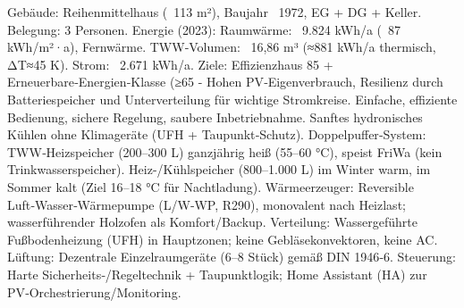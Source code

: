 \markdownRendererDocumentBegin
\markdownRendererSectionBegin
{}\markdownRendererInterblockSeparator
{}\markdownRendererUlBeginTight
\markdownRendererUlItem Gebäude: Reihenmittelhaus (~113 m²), Baujahr ~1972, EG + DG + Keller.\markdownRendererUlItemEnd 
\markdownRendererUlItem Belegung: 3 Personen.\markdownRendererUlItemEnd 
\markdownRendererUlItem Energie (2023):\markdownRendererUlItemEnd 
\markdownRendererUlItem Raumwärme: ~9.824 kWh/a (~87 kWh/m²·a), Fernwärme.\markdownRendererUlItemEnd 
\markdownRendererUlItem TWW‑Volumen: ~16,86 m³ (≈881 kWh/a thermisch, ΔT≈45 K).\markdownRendererUlItemEnd 
\markdownRendererUlItem Strom: ~2.671 kWh/a.\markdownRendererUlItemEnd 
\markdownRendererUlItem Ziele:\markdownRendererUlItemEnd 
\markdownRendererUlItem Effizienzhaus 85 + Erneuerbare‑Energien‑Klasse (≥65 - Hohen PV‑Eigenverbrauch, Resilienz durch Batteriespeicher und Unterverteilung für wichtige Stromkreise.\markdownRendererUlItemEnd 
\markdownRendererUlItem Einfache, effiziente Bedienung, sichere Regelung, saubere Inbetriebnahme.\markdownRendererUlItemEnd 
\markdownRendererUlItem Sanftes hydronisches Kühlen ohne Klimageräte (UFH + Taupunkt‑Schutz).\markdownRendererUlItemEnd 
\markdownRendererUlEndTight \markdownRendererInterblockSeparator
{}\markdownRendererSectionBegin
{}\markdownRendererInterblockSeparator
{}\markdownRendererUlBeginTight
\markdownRendererUlItem Doppelpuffer‑System:\markdownRendererUlItemEnd 
\markdownRendererUlItem TWW‑Heizspeicher (200–300 L) ganzjährig heiß (55–60 °C), speist FriWa (kein Trinkwasserspeicher).\markdownRendererUlItemEnd 
\markdownRendererUlItem Heiz-/Kühlspeicher (800–1.000 L) im Winter warm, im Sommer kalt (Ziel 16–18 °C für Nachtladung).\markdownRendererUlItemEnd 
\markdownRendererUlItem Wärmeerzeuger: Reversible Luft‑Wasser‑Wärmepumpe (L/W‑WP, R290), monovalent nach Heizlast; wasserführender Holzofen als Komfort/Backup.\markdownRendererUlItemEnd 
\markdownRendererUlItem Verteilung: Wassergeführte Fußbodenheizung (UFH) in Hauptzonen; keine Gebläsekonvektoren, keine AC.\markdownRendererUlItemEnd 
\markdownRendererUlItem Lüftung: Dezentrale Einzelraumgeräte (6–8 Stück) gemäß DIN 1946‑6.\markdownRendererUlItemEnd 
\markdownRendererUlItem Steuerung: Harte Sicherheits‑/Regeltechnik + Taupunktlogik; Home Assistant (HA) zur PV‑Orchestrierung/Monitoring.\markdownRendererUlItemEnd 
\markdownRendererUlEndTight \markdownRendererInterblockSeparator
{}
\markdownRendererSectionEnd \markdownRendererSectionBegin
{}\markdownRendererInterblockSeparator

